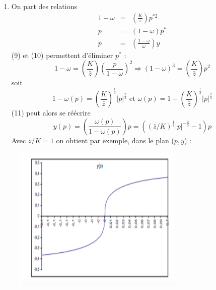 \documentclass[11pt,a4paper]{article}
\begin{document}
\begin{enumerate}
\item On part des relations%
\begin{eqnarray}
1-\omega &=&\left( \frac{K}{\bar{z}}\right) p^{\ast 2}  \\
p &=&\left( 1-\omega \right) p^{\ast }  \\
p &=&\left( \frac{1-\omega }{\omega }\right) y 
\end{eqnarray}%
\newline
(9) et (10) permettent d'\'{e}liminer $p^{\ast }$ :%
\begin{equation*}
1-\omega =\left( \frac{K}{\bar{z}}\right) \left( \frac{p}{1-\omega }\right)
^{2}\Rightarrow \left( 1-\omega \right) ^{3}=\left( \frac{K}{\bar{z}}\right)
p^{2}
\end{equation*}%
soit%
\begin{equation*}
1-\omega \left( p\right) =\left( \frac{K}{\bar{z}}\right) ^{\frac{1}{3}%
}\left\vert p\right\vert ^{\frac{2}{3}}\text{ \ \ et \ \ }\omega \left(
p\right) =1-\left( \frac{K}{\bar{z}}\right) ^{\frac{1}{3}}\left\vert
p\right\vert ^{\frac{2}{3}}
\end{equation*}%
(11) peut alors se r\'{e}\'{e}crire%
\begin{equation*}
y\left( p\right) =\left( \frac{\omega \left( p\right) }{1-\omega \left(
p\right) }\right) p=\left( \left( \bar{z}/K\right) ^{\frac{1}{3}}\left\vert
p\right\vert ^{-\frac{2}{3}}-1\right) p
\end{equation*}%
Avec $\bar{z}/K=1$ on obtient par exemple, dans le plan ($p,y$) :%

\begin{center}
\includegraphics[width=9cm, height=7cm]{2.png}
\end{center}


\end{enumerate}
\end{document}
